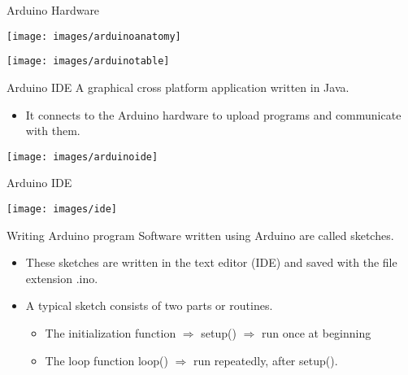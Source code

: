 \documentclass{beamer}
\begin{document}
\begin{darkframes}
\begin{frame}[<+->]{Arduino Hardware}
	\begin{center}
		\texttt{[image: images/arduinoanatomy]} 
	\end{center}
	\begin{center}
		\texttt{[image: images/arduinotable]} 
	\end{center}
\end{frame}    

\begin{frame}[<+->]{Arduino IDE}
	A graphical cross platform application written in Java.
	\begin{itemize}
		\item It connects to the Arduino hardware to upload programs and communicate with them.
	\end{itemize}
	\begin{center}
		\texttt{[image: images/arduinoide]} 
	\end{center}
	
\end{frame}    

\begin{frame}[<+->]{Arduino IDE}
	\begin{center}
		\texttt{[image: images/ide]} 
	\end{center}
	
\end{frame}    

\begin{frame}[<+->]{Writing Arduino program}
	Software written using Arduino are called \alert{sketches}.
	\begin{itemize}
		\item These sketches are written in the text editor (IDE) and saved with the file extension \alert{.ino}.
		\item A typical sketch consists of two parts or routines.
		\begin{itemize}
			\item The initialization function $\Rightarrow$ \alert{setup()} $\Rightarrow$ run once at beginning
			\item The loop function \alert{loop()}  $\Rightarrow$ run repeatedly, after setup().
		\end{itemize}
		
	\end{itemize}
	
	
\end{frame}  



\end{darkframes}
\end{document}
